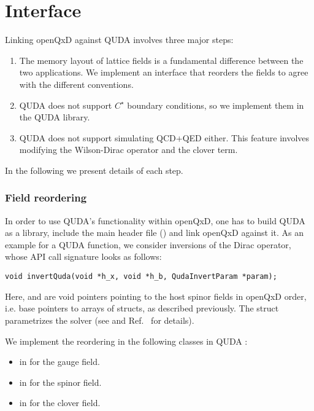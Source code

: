 \chapter{Interface}
\label{ch:p1:interface}


Linking openQxD against QUDA involves three major steps:

\begin{enumerate}
\item{The memory layout of lattice fields is a fundamental difference between the two applications. We implement an interface that reorders the fields to agree with the different conventions.}
\item{QUDA does not support $C^\star$ boundary conditions, so we implement them in the QUDA library.}
\item{QUDA does not support simulating QCD+QED either. This feature involves modifying the Wilson-Dirac operator and the clover term.}
\end{enumerate}

In the following we present details of each step.

\subsection{Field reordering}

In order to use QUDA's functionality within openQxD, one has to build QUDA as a library, include the main header file () and link openQxD against it. 
As an example for a QUDA function, we consider inversions of the Dirac operator, whose API call signature looks as follows:

\begin{verbatim}
void invertQuda(void *h_x, void *h_b, QudaInvertParam *param);
\end{verbatim}

Here,  and  are void pointers pointing to the host spinor fields in openQxD order, i.e. base pointers to arrays of  structs, as described previously. The  struct parametrizes the solver (see  and Ref.~\cite{QUDApaper} for details).


We implement the reordering in the following classes in QUDA \cite{QUDApaper}:
\begin{itemize}
  \item {} in  for the gauge field.
  \item {} in  for the spinor field.
  \item {} in  for the clover field.
\end{itemize}

